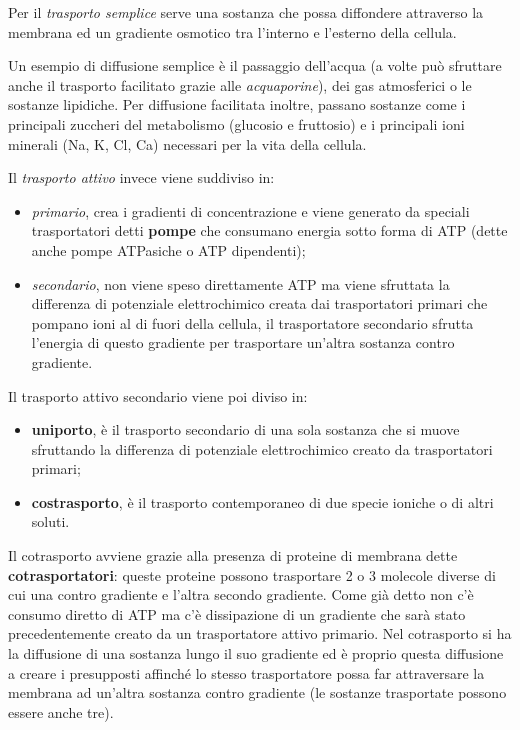 \documentclass[]{article}
\begin{document}
Per il \emph{trasporto semplice} serve una sostanza che possa diffondere
attraverso la membrana ed un gradiente osmotico tra l'interno e
l'esterno della cellula.

Un esempio di diffusione semplice è il passaggio dell'acqua (a volte può
sfruttare anche il trasporto facilitato grazie alle \emph{acquaporine}),
dei gas atmosferici o le sostanze lipidiche. Per diffusione facilitata
inoltre, passano sostanze come i principali zuccheri del metabolismo
(glucosio e fruttosio) e i principali ioni minerali (Na, K, Cl, Ca)
necessari per la vita della cellula.

Il \emph{trasporto attivo} invece viene suddiviso in:

\begin{itemize}
\itemsep1pt\parskip0pt
\item
  \emph{primario}, crea i gradienti di concentrazione e viene generato
  da speciali trasportatori detti \textbf{pompe} che consumano energia
  sotto forma di ATP (dette anche pompe ATPasiche o ATP dipendenti);
\item
  \emph{secondario}, non viene speso direttamente ATP ma viene sfruttata
  la differenza di potenziale elettrochimico creata dai trasportatori
  primari che pompano ioni al di fuori della cellula, il trasportatore
  secondario sfrutta l'energia di questo gradiente per trasportare
  un'altra sostanza contro gradiente.
\end{itemize}

Il trasporto attivo secondario viene poi diviso in:

\begin{itemize}
\itemsep1pt\parskip0pt
\item
  \textbf{uniporto}, è il trasporto secondario di una sola sostanza che
  si muove sfruttando la differenza di potenziale elettrochimico creato
  da trasportatori primari;
\item
  \textbf{costrasporto}, è il trasporto contemporaneo di due specie
  ioniche o di altri soluti.
\end{itemize}

Il cotrasporto avviene grazie alla presenza di proteine di membrana
dette \textbf{cotrasportatori}: queste proteine possono trasportare 2 o
3 molecole diverse di cui una contro gradiente e l'altra secondo
gradiente. Come già detto non c'è consumo diretto di ATP ma c'è
dissipazione di un gradiente che sarà stato precedentemente creato da un
trasportatore attivo primario. Nel cotrasporto si ha la diffusione di
una sostanza lungo il suo gradiente ed è proprio questa diffusione a
creare i presupposti affinché lo stesso trasportatore possa far
attraversare la membrana ad un'altra sostanza contro gradiente (le
sostanze trasportate possono essere anche tre).
\end{document}
